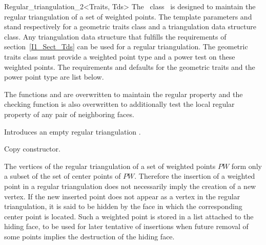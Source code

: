 \begin{ccClassTemplate}{Regular_triangulation_2<Traits, Tds>}
The \cgal\  class \ccClassTemplateName\ is designed to maintain the
regular triangulation of a set of weighted points.
The template parameters   and  stand respectively
 for a geometric traits class and a triangulation data structure class.
Any triangulation data structure that fulfills the requirements of 
section~\ref{I1_Sect_Tds} can be used for a regular triangulation.
The geometric traits class must provide a weighted point type
and a power test on these weighted points. The requirements and defaults
for the geometric traits and the power point type are list below.


 \ccInheritsFrom


The functions  and 
 are overwritten to maintain the regular
property
and the checking function  is also overwritten
to additionally test the local regular property of 
any pair of neighboring faces.

\ccTypes
{}
\ccThreeToTwo

\ccGlue
{}

\ccCreation
{}

{Introduces an empty regular triangulation \ccVar.}

{Copy constructor.}



The vertices of the regular triangulation
of a set of weighted points ${  PW}$ form only a subset
of the set of center points of ${   PW}$.
Therefore the  insertion of a weighted point  in a regular triangulation
does not necessarily imply the creation of a new vertex.
If the new inserted point does not appear as a vertex in the
regular triangulation, it is said to be hidden 
by the face in which the corresponding center point is located.
Such a weighted point is stored in a list attached to the hiding face,
to be used for later tentative of insertions when future removal
of some points implies the destruction of the hiding face.



\end{ccClassTemplate}
